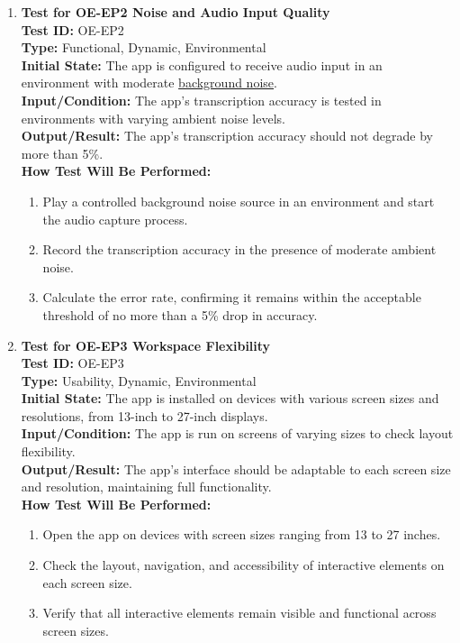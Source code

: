 \documentclass[12pt, titlepage]{article}
\begin{document}
\begin{enumerate}
    \item \textbf{Test for OE-EP2 Noise and Audio Input Quality} \\
      \newline
      \textbf{Test ID:} OE-EP2 \\
      \textbf{Type:} Functional, Dynamic, Environmental \\
      \textbf{Initial State:} The app is configured to receive audio input in an environment with moderate 
      \href{https://github.com/emilyperica/ScoreGen/tree/main/test/TestingDatasets/noise-samples}{background noise}\citep*{noise}. \\
      \textbf{Input/Condition:} The app’s transcription accuracy is tested in environments with varying ambient noise levels. \\
      \textbf{Output/Result:} The app’s transcription accuracy should not degrade by more than 5\%. \\
      \textbf{How Test Will Be Performed:}
      \begin{enumerate}
          \item Play a controlled background noise source in an environment and start the audio capture process.
          \item Record the transcription accuracy in the presence of moderate ambient noise.
          \item Calculate the error rate, confirming it remains within the acceptable threshold of no more than a 5\% drop in accuracy.
      \end{enumerate}

    \item \textbf{Test for OE-EP3 Workspace Flexibility} \\
      \newline
      \textbf{Test ID:} OE-EP3 \\
      \textbf{Type:} Usability, Dynamic, Environmental \\
      \textbf{Initial State:} The app is installed on devices with various screen sizes and resolutions, from 13-inch to 
      27-inch displays. \\
      \textbf{Input/Condition:} The app is run on screens of varying sizes to check layout flexibility. \\
      \textbf{Output/Result:} The app’s interface should be adaptable to each screen size and resolution, maintaining 
      full functionality. \\
      \textbf{How Test Will Be Performed:}
      \begin{enumerate}
          \item Open the app on devices with screen sizes ranging from 13 to 27 inches.
          \item Check the layout, navigation, and accessibility of interactive elements on each screen size.
          \item Verify that all interactive elements remain visible and functional across screen sizes.
      \end{enumerate}


\end{enumerate}
\end{document}
